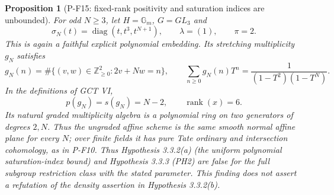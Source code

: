 \documentclass[11pt,a4paper]{article}
\newtheorem{proposition}{Proposition}[section]
\begin{document}
\begin{proposition}[P-F15: fixed-rank positivity and saturation indices are unbounded]
\label{prop:torusindices}
For odd $N\ge3$, let $H=\mathbb G_m$, $G=GL_3$ and
\[
 \sigma_N(t)=\operatorname{diag}(t,t^3,t^{N+1}),
 \qquad \lambda=(1),\qquad\pi=2.
\]
This is again a faithful explicit polynomial embedding. Its stretching
multiplicity $g_N$ satisfies
\[
 g_N(n)=\#\{(v,w)\in\mathbb Z_{\ge0}^2:2v+Nw=n\},
 \qquad
 \sum_{n\ge0}g_N(n)T^n=\frac1{(1-T^2)(1-T^N)}.
\]
In the definitions of GCT VI,
\[
 p(g_N)=s(g_N)=N-2,
 \qquad \operatorname{rank}(x)=6.
 \tag{P-F15}
\]
Its natural graded multiplicity algebra is a polynomial ring on two
generators of degrees $2,N$. Thus the ungraded affine scheme is the
same smooth normal affine plane for every $N$; over finite fields it
has pure Tate ordinary and intersection cohomology, as in P-F10.
Thus Hypothesis 3.3.2(a) (the uniform polynomial saturation-index
bound) and Hypothesis 3.3.3 (PH2) are false for the full subgroup
restriction class with the stated parameter. This finding does not
assert a refutation of the density assertion in Hypothesis 3.3.2(b).
\end{proposition}
\end{document}
